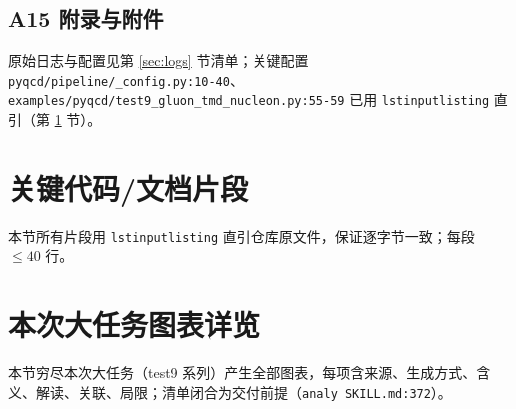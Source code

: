 \documentclass[UTF8]{ctexart}
\begin{document}
\subsection{A15 附录与附件}
原始日志与配置见第 \ref{sec:logs} 节清单；关键配置 \texttt{\nolinkurl{pyqcd/pipeline/\_config.py:10-40}}、\texttt{\nolinkurl{examples/pyqcd/test9\_gluon\_tmd\_nucleon.py:55-59}} 已用 \texttt{lstinputlisting} 直引（第 \ref{sec:fragments} 节）。

\section{关键代码/文档片段}
\label{sec:fragments}
本节所有片段用 \texttt{lstinputlisting} 直引仓库原文件，保证逐字节一致；每段 $\le40$ 行。















\section{本次大任务图表详览}
\label{sec:charts}
本节穷尽本次大任务（test9 系列）产生全部图表，每项含来源、生成方式、含义、解读、关联、局限；清单闭合为交付前提（\texttt{\nolinkurl{analy SKILL.md:372}}）。
\end{document}
